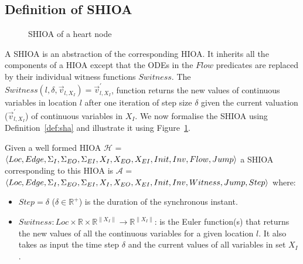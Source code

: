 
\subsection{Definition of \acf{SHIOA}}
\label{sec:defSHA}

\begin{figure}
  \centering
  
  \caption{\acf{SHIOA} of a heart node \label{fig:heartCellSHA}}
\end{figure}

A \ac{SHIOA} is an abstraction of the corresponding \ac{HIOA}.  It
inherits all the components of a \ac{HIOA} except that the ODEs in the
$Flow$ predicates are replaced by their individual witness functions
$Switness$. The
$Switness(l,\delta,\vec{v}_{l,X_{I}})=\vec{v}^{\prime}_{l,X_{I}}$,
function returns the new values of continuous variables in location $l$
after one iteration of step size $\delta$ given the current valuation
($\vec{v}^{\prime}_{l,X_{I}}$) of continuous variables in $X_{I}$.  We
now formalise the \ac{SHIOA} using Definition~\ref{def:sha} and
illustrate it using Figure~\ref{fig:heartCellSHA}.

\begin{definition}
  Given a well formed HIOA $\mathcal{H}$ =
  $\langle Loc, Edge, \Sigma_I, \Sigma_{EO}, \Sigma_{EI}, X_I, X_{EO},
  X_{EI}, \linebreak Init, Inv, Flow, Jump\rangle$
  a SHIOA corresponding to this HIOA is $\mathcal{A}$ =
  $\langle Loc, Edge, \Sigma_I, \Sigma_{EO}, \Sigma_{EI}, X_I,
  X_{EO},\linebreak X_{EI}, Init, Inv, Witness, Jump, Step\rangle$
  where:
  \begin{itemize}
  \item $Step = \delta$ ($\delta \in \mathbb{R}^+$) is the duration of
    the synchronous instant.
  \item
    $Switness: Loc \times \mathbb{R} \times \mathbb{R}^{\|X_{I}\|}
    \rightarrow \mathbb{R}^{\|X_{I}\|}$:
    is the Euler function(s) that returns the new values of all the
    continuous variables for a given location $l$.  It also takes as
    input the time step $\delta$ and the current values of all variables
    in set $X_{I}$.
  \end{itemize}
  \label{def:sha}
\end{definition}


